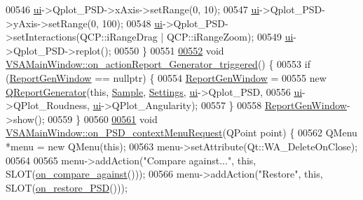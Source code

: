 \begin{DoxyCode}
{00546   \hyperlink{class_v_s_a_main_window_a958a0581d2bf1bfe020c3b5d8f738640}{ui}->Qplot\_PSD->xAxis->setRange(0, 10);
00547   \hyperlink{class_v_s_a_main_window_a958a0581d2bf1bfe020c3b5d8f738640}{ui}->Qplot\_PSD->yAxis->setRange(0, 100);
00548   \hyperlink{class_v_s_a_main_window_a958a0581d2bf1bfe020c3b5d8f738640}{ui}->Qplot\_PSD->setInteractions(QCP::iRangeDrag | QCP::iRangeZoom);
00549   \hyperlink{class_v_s_a_main_window_a958a0581d2bf1bfe020c3b5d8f738640}{ui}->Qplot\_PSD->replot();
00550 \}
00551 
\hypertarget{vsamainwindow_8cpp_source_l00552}{}\hyperlink{class_v_s_a_main_window_aaeec63d325c863eba2b1bce5e0eaa05e}{00552} \textcolor{keywordtype}{void} \hyperlink{class_v_s_a_main_window_aaeec63d325c863eba2b1bce5e0eaa05e}{VSAMainWindow::on\_actionReport\_Generator\_triggered}()
       \{
00553   \textcolor{keywordflow}{if} (\hyperlink{class_v_s_a_main_window_a38a41496820a4c6ad8220c02d19ab77c}{ReportGenWindow} == \textcolor{keyword}{nullptr}) \{
00554     \hyperlink{class_v_s_a_main_window_a38a41496820a4c6ad8220c02d19ab77c}{ReportGenWindow} =
00555         \textcolor{keyword}{new} \hyperlink{class_q_report_generator}{QReportGenerator}(\textcolor{keyword}{this}, \hyperlink{class_v_s_a_main_window_a09d2f0c3ef8247e9c46932f866cab132}{Sample}, \hyperlink{class_v_s_a_main_window_a429310b9a60f66c4283dc609f869b48d}{Settings}, 
      \hyperlink{class_v_s_a_main_window_a958a0581d2bf1bfe020c3b5d8f738640}{ui}->Qplot\_PSD,
00556                              \hyperlink{class_v_s_a_main_window_a958a0581d2bf1bfe020c3b5d8f738640}{ui}->QPlot\_Roudness, \hyperlink{class_v_s_a_main_window_a958a0581d2bf1bfe020c3b5d8f738640}{ui}->QPlot\_Angularity);
00557   \}
00558   \hyperlink{class_v_s_a_main_window_a38a41496820a4c6ad8220c02d19ab77c}{ReportGenWindow}->show();
00559 \}
00560 
\hypertarget{vsamainwindow_8cpp_source_l00561}{}\hyperlink{class_v_s_a_main_window_a8d9025970a6a3b27c1f83a92df6c1bad}{00561} \textcolor{keywordtype}{void} \hyperlink{class_v_s_a_main_window_a8d9025970a6a3b27c1f83a92df6c1bad}{VSAMainWindow::on\_PSD\_contextMenuRequest}(QPoint point) \{
00562   QMenu *menu = \textcolor{keyword}{new} QMenu(\textcolor{keyword}{this});
00563   menu->setAttribute(Qt::WA\_DeleteOnClose);
00564 
00565   menu->addAction(\textcolor{stringliteral}{"Compare against..."}, \textcolor{keyword}{this}, SLOT(\hyperlink{class_v_s_a_main_window_a26fbb5e4ad62a0aeef99b8ae23c0e85e}{on\_compare\_against}()));
00566   menu->addAction(\textcolor{stringliteral}{"Restore"}, \textcolor{keyword}{this}, SLOT(\hyperlink{class_v_s_a_main_window_ad336ffb25b343972e0dbd6d2584a492e}{on\_restore\_PSD}()));
}
\end{DoxyCode}
